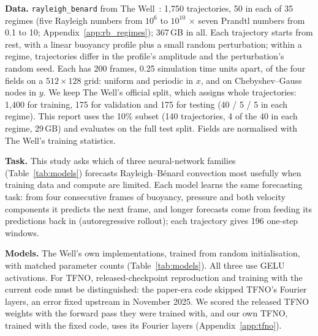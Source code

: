 \documentclass[11pt]{article}
\begin{document}
\textbf{Data.} \texttt{rayleigh\_benard} from The Well~\cite{ohana2024well,wellrb}: 1,750 trajectories, 50 in each
of 35 regimes (five Rayleigh numbers from $10^6$ to $10^{10}$ $\times$ seven Prandtl numbers from 0.1 to 10;
Appendix~\ref{app:rb_regimes}); 367\,GB in all. Each trajectory starts from rest, with a linear buoyancy profile plus a small random perturbation;
within a regime, trajectories differ in the profile's amplitude and the perturbation's random seed. Each has
200 frames, 0.25 simulation time units apart, of the four fields on a $512\times128$ grid: uniform and periodic in
$x$, and on Chebyshev--Gauss nodes in $y$. 
We keep The
Well's official split, which assigns whole trajectories: 1,400 for training, 175 for validation and 175 for testing
(40 / 5 / 5 in each regime). This report uses the 10\% subset (140 trajectories, 4 of the 40 in
each regime, 29\,GB) and evaluates on the full test split. Fields are normalised with The Well's training statistics.


\textbf{Task.} This study asks which of three neural-network families (Table~\ref{tab:models}) forecasts
Rayleigh--B\'enard convection most usefully when training data and compute are limited. Each model learns the same
forecasting task: from four consecutive frames of buoyancy, pressure and both velocity components it predicts the
next frame, and longer forecasts come from feeding its predictions back in (autoregressive rollout); each trajectory
gives 196 one-step windows. 




\textbf{Models.} The Well's own implementations, trained from random initialisation, with matched parameter
counts (Table~\ref{tab:models}). All three use GELU activations. For TFNO, released-checkpoint reproduction and
training with the current code must be distinguished: the paper-era code skipped TFNO's Fourier layers, an error
fixed upstream in November 2025. We scored the released TFNO weights with the forward pass they were trained
with, and our own TFNO, trained with the fixed code, uses its Fourier layers
(Appendix~\ref{app:tfno}).
\end{document}
